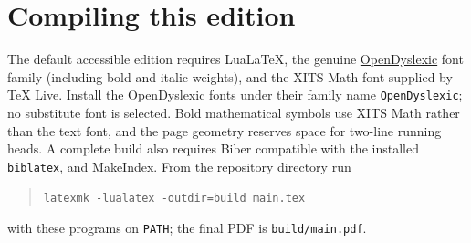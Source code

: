 \documentclass[../main]{subfiles}
\begin{document}
\section*{Compiling this edition}
The default accessible edition requires LuaLaTeX, the genuine
\href{https://opendyslexic.org/}{OpenDyslexic} font family (including bold and
italic weights), and the XITS Math font supplied by TeX Live. Install the
OpenDyslexic fonts under their family name \texttt{OpenDyslexic}; no substitute
font is selected. Bold mathematical symbols use XITS Math rather than the text
font, and the page geometry reserves space for two-line running heads.
A complete build also requires Biber compatible with the
installed \texttt{biblatex}, and MakeIndex. From the repository directory run
\begin{quote}
\texttt{latexmk -lualatex -outdir=build main.tex}
\end{quote}
with these programs on \texttt{PATH}; the final PDF is \texttt{build/main.pdf}.
\end{document}
